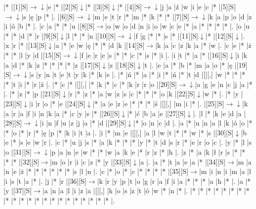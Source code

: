 \documentclass[11pt]{article}
\newcommand\drarr{$\rightarrow \!\!\!\!\! \downarrow$}
\newcommand\rarr{$\rightarrow$}
\newcommand\darr{$\downarrow$}
\begin{document}
\noindent\begin{Puzzle}{21}{23}|*	|[1][S]\drarr	|e	|*	|[2][S]\darr	|*	|[3][S]\darr	|*	|[4][S]\drarr	|j	|a	|ź	|w	|i	|e	|c	|*	|[5][S]\drarr	|s	|ę	|p	|*	|.
|[6][S]\drarr	|m	|e	|t	|r	|*	|m	|*	|k	|*	|*	|[7][S]\drarr	|k	|a	|p	|o	|d	|z	|i	|ó	|b	|*	|.
|c	|a	|*	|*	|u	|[8][S]\rarr	|o	|w	|o	|d	|n	|i	|o	|w	|c	|e	|*	|a	|*	|*	|*	|*	|.
|o	|u	|*	|*	|d	|*	|r	|[9][S]\darr	|l	|*	|*	|n	|[10][S]\drarr	|f	|g	|*	|*	|s	|*	|[11][S]\darr	|*	|[12][S]\darr	|.
|x	|r	|*	|[13][S]\darr	|a	|*	|e	|w	|ę	|*	|*	|d	|k	|[14][S]\rarr	|k	|a	|c	|z	|k	|a	|*	|w	|.
|c	|e	|*	|ż	|*	|*	|l	|y	|d	|[15][S]\drarr	|f	|e	|r	|e	|s	|*	|*	|c	|*	|s	|*	|i	|.
|i	|t	|*	|a	|*	|[16][S]\darr	|i	|k	|a	|d	|*	|k	|z	|*	|*	|*	|*	|z	|[17][S]\darr	|z	|[18][S]\darr	|t	|.
|e	|a	|*	|b	|*	|m	|a	|o	|*	|ę	|[19][S]\drarr	|s	|y	|n	|t	|e	|t	|y	|k	|*	|k	|e	|.
|*	|ń	|*	|a	|*	|i	|*	|ń	|*	|t	|d	|[][,]{ }	|w	|*	|*	|*	|*	|t	|i	|*	|r	|ź	|.
|*	|c	|*	|[][,]{ }	|*	|k	|*	|c	|*	|k	|r	|r	|o	|[20][S]\drarr	|a	|g	|e	|n	|c	|j	|a	|*	|.
|*	|z	|*	|p	|[21][S]\darr	|r	|*	|z	|*	|a	|w	|z	|s	|c	|*	|*	|*	|o	|k	|[22][S]\darr	|w	|*	|.
|*	|y	|[23][S]\darr	|i	|r	|o	|*	|e	|[24][S]\darr	|*	|a	|e	|z	|e	|*	|*	|*	|ś	|[][,]{ }	|m	|i	|*	|.
|[25][S]\drarr	|k	|a	|r	|a	|f	|i	|n	|k	|a	|*	|c	|y	|s	|*	|[26][S]\darr	|*	|ć	|b	|a	|e	|[27][S]\darr	|.
|l	|*	|k	|e	|d	|a	|[28][S]\drarr	|i	|n	|f	|u	|z	|j	|a	|*	|d	|[29][S]\darr	|*	|o	|n	|c	|d	|.
|a	|*	|u	|n	|a	|l	|k	|ó	|o	|*	|*	|o	|*	|r	|*	|ę	|p	|*	|k	|i	|t	|a	|.
|i	|*	|m	|e	|[][,]{ }	|a	|l	|w	|t	|*	|*	|w	|*	|s	|[30][S]\darr	|b	|e	|*	|s	|e	|w	|r	|.
|c	|*	|u	|j	|s	|*	|a	|k	|*	|*	|*	|y	|*	|t	|d	|s	|r	|*	|e	|r	|o	|c	|.
|y	|*	|l	|s	|o	|[31][S]\drarr	|p	|a	|n	|e	|w	|*	|*	|w	|a	|k	|e	|*	|r	|z	|*	|h	|.
|z	|*	|a	|k	|ł	|r	|s	|*	|*	|*	|*	|[32][S]\rarr	|m	|o	|r	|i	|c	|z	|*	|y	|[33][S]\darr	|a	|.
|a	|*	|t	|a	|e	|a	|*	|[34][S]\rarr	|m	|a	|n	|e	|ż	|*	|*	|*	|*	|*	|*	|s	|l	|n	|.
|c	|*	|o	|*	|c	|*	|*	|*	|*	|[35][S]\rarr	|m	|i	|n	|i	|m	|a	|l	|i	|s	|t	|a	|*	|.
|j	|*	|r	|[36][S]\rarr	|k	|r	|y	|p	|t	|o	|g	|r	|a	|f	|i	|a	|*	|*	|*	|a	|h	|*	|.
|a	|*	|y	|[37][S]\rarr	|a	|n	|a	|l	|i	|z	|a	|[][,]{ }	|k	|o	|s	|z	|t	|ó	|w	|*	|n	|*	|.
|*	|*	|*	|*	|*	|*	|*	|*	|*	|*	|*	|*	|*	|*	|*	|*	|*	|*	|*	|*	|*	|*	|.\end{Puzzle}

\newpage
\end{document}

